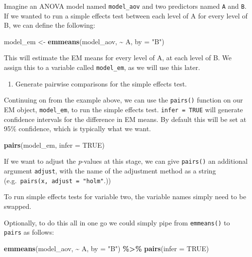\documentclass[
]{book}
\newenvironment{Shaded}{\begin{snugshade}}{\end{snugshade}}
\newcommand{\AttributeTok}[1]{\textcolor[rgb]{0.13,0.29,0.53}{#1}}
\newcommand{\ConstantTok}[1]{\textcolor[rgb]{0.56,0.35,0.01}{#1}}
\newcommand{\FunctionTok}[1]{\textcolor[rgb]{0.13,0.29,0.53}{\textbf{#1}}}
\newcommand{\NormalTok}[1]{#1}
\newcommand{\OtherTok}[1]{\textcolor[rgb]{0.56,0.35,0.01}{#1}}
\newcommand{\SpecialCharTok}[1]{\textcolor[rgb]{0.81,0.36,0.00}{\textbf{#1}}}
\newcommand{\StringTok}[1]{\textcolor[rgb]{0.31,0.60,0.02}{#1}}
\providecommand{\tightlist}{%
  \setlength{\itemsep}{0pt}\setlength{\parskip}{0pt}}
\begin{document}
Imagine an ANOVA model named \texttt{model\_aov} and two predictors named \texttt{A} and \texttt{B}. If we wanted to run a simple effects test between each level of A for every level of B, we can define the following:

\begin{Shaded}
\begin{Highlighting}[]
\NormalTok{model\_em }\OtherTok{\textless{}{-}} \FunctionTok{emmeans}\NormalTok{(model\_aov, }\SpecialCharTok{\textasciitilde{}}\NormalTok{ A, }\AttributeTok{by =} \StringTok{"B"}\NormalTok{)}
\end{Highlighting}
\end{Shaded}

This will estimate the EM means for every level of A, at each level of B. We assign this to a variable called \texttt{model\_em}, as we will use this later.

\begin{enumerate}
\def\labelenumi{\arabic{enumi}.}
\setcounter{enumi}{1}
\tightlist
\item
  Generate pairwise comparisons for the simple effects test.
\end{enumerate}

Continuing on from the example above, we can use the \texttt{pairs()} function on our EM object, \texttt{model\_em}, to run the simple effects test. \texttt{infer\ =\ TRUE} will generate confidence intervals for the difference in EM means. By default this will be set at 95\% confidence, which is typically what we want.

\begin{Shaded}
\begin{Highlighting}[]
\FunctionTok{pairs}\NormalTok{(model\_em, }\AttributeTok{infer =} \ConstantTok{TRUE}\NormalTok{)}
\end{Highlighting}
\end{Shaded}

If we want to adjust the \emph{p}-values at this stage, we can give \texttt{pairs()} an additional argument \texttt{adjust}, with the name of the adjustment method as a string (e.g.~\texttt{pairs(x,\ adjust\ =\ "holm"}.))

To run simple effects tests for variable two, the variable names simply need to be swapped.

Optionally, to do this all in one go we could simply pipe from \texttt{emmeans()} to \texttt{pairs} as follows:

\begin{Shaded}
\begin{Highlighting}[]
\FunctionTok{emmeans}\NormalTok{(model\_aov, }\SpecialCharTok{\textasciitilde{}}\NormalTok{ A, }\AttributeTok{by =} \StringTok{"B"}\NormalTok{) }\SpecialCharTok{\%\textgreater{}\%}
  \FunctionTok{pairs}\NormalTok{(}\AttributeTok{infer =} \ConstantTok{TRUE}\NormalTok{)}
\end{Highlighting}
\end{Shaded}
\end{document}
